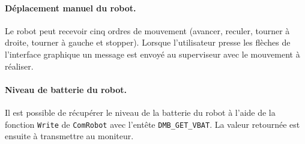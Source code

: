 \paragraph{Déplacement manuel du robot.} Le robot peut recevoir cinq ordres de mouvement (avancer, reculer, tourner à droite, tourner à gauche et stopper). Lorsque l'utilisateur presse les flèches de l'interface graphique un message est envoyé au superviseur avec le mouvement à réaliser.\\


\paragraph{Niveau de batterie du robot.} Il est possible de récupérer le niveau de la batterie du robot à l'aide de la fonction  {\tt Write} de {\tt ComRobot} avec l'entête {\tt DMB\_GET\_VBAT}. La valeur retournée est ensuite à transmettre au moniteur.\\



